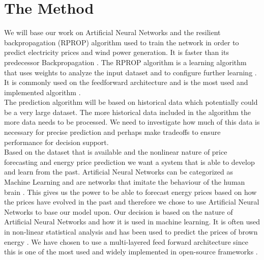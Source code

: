 \documentclass[twoside,11pt,openright]{report}
\begin{document}
\section{The Method}
We will base our work on Artificial Neural Networks and the resilient backpropagation (RPROP) algorithm used to train the network in order to predict electricity prices and wind power generation. It is faster than its predecessor Backpropagation \cite{8,15}.  The RPROP algorithm is a learning algorithm that uses weights to analyze the input dataset and to configure further learning \cite{17}. It is commonly used on the feedforward architecture and is the most used and implemented algorithm \cite{14,17}.
\\[0.5cm] 
The prediction algorithm will be based on historical data which potentially could be a very large dataset. The more historical data included in the algorithm the more data needs to be processed. We need to investigate how much of this data is necessary for precise prediction and perhaps make tradeoffs to ensure performance for decision support.
\\[0.5cm]
Based on the dataset that is available and the nonlinear nature of price forecasting and energy price prediction we want a system that is able to develop and learn from the past. Artificial Neural Networks can be categorized as Machine Learning \cite{18} and are networks that imitate the behaviour of the human brain \cite{1}. This gives us the power to be able to forecast energy prices based on how the prices have evolved in the past and therefore we chose to use Artificial Neural Networks to base our model upon. Our decision is based on the nature of Artificial Neural Networks and how it is used in machine learning. It is often used in non-linear statistical analysis \cite{16} and has been used to predict the prices of brown energy \cite{2,3}. We have chosen to use a multi-layered feed forward architecture since this is one of the most used and widely implemented in open-source frameworks \cite{17}.
\end{document}
